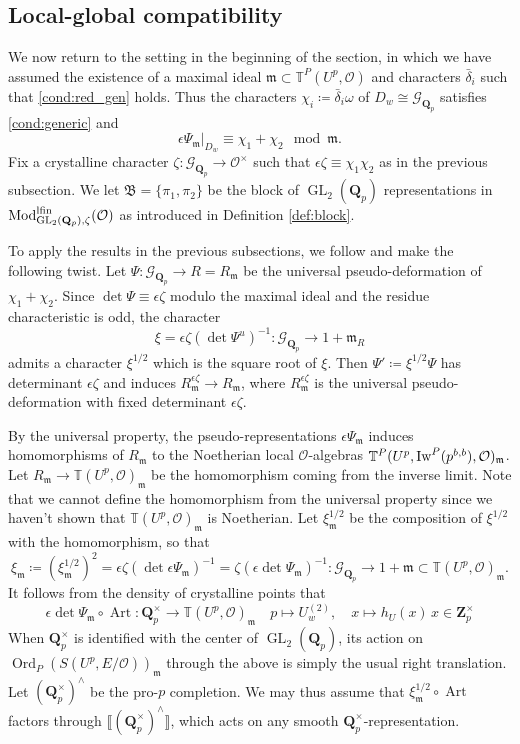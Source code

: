 \documentclass[leqno]{amsart}
\newcommand{\TT}{\mathbb{T}} %
\newcommand{\Iw}{\textnormal{Iw}}
\newcommand{\lfMod}{\textnormal{Mod}^{\textnormal{lfin}}}
\newcommand{\B}{\mathfrak B}
\newcommand{\Gp}{\mathcal{G}_{\Qp}} %
\DeclareMathOperator{\Ord}{Ord}
\DeclareMathOperator{\Art}{Art}
\DeclareMathOperator{\GL}{GL}
\newcommand{\Qp}{\mathbf{Q}_p}
\newcommand{\Zp}{\mathbf{Z}_p}
\newcommand{\oo}{\mathcal{O}} %
\newcommand{\fm}{\mathfrak{m}}
\theoremstyle{definition}
\theoremstyle{remark}
\begin{document}
\subsection{Local-global compatibility}
\label{sub:compatible}

We now return to the setting in 
the beginning of the section,
in which we have assumed 
the existence of
a maximal ideal $\fm\subset \TT^P(U^p,\oo)$ 
and characters $\bar{\delta}_i$
such that \eqref{cond:red_gen} holds.
Thus the characters
$\chi_i\coloneqq\bar{\delta}_i\omega$
of $D_w\cong \Gp$
satisfies \eqref{cond:generic} and
\[
	\epsilon\Psi_\fm\vert_{D_w}\equiv
	\chi_1+\chi_2 \mod \fm.
\]
Fix a crystalline character 
$\zeta\colon \Gp\to \oo^\times$ 
such that $\epsilon\zeta\equiv \chi_1\chi_2$
as in the previous subsection.
We let $\B=\{\pi_1,\pi_2\}$
be the block of $\GL_2(\Qp)$
representations
in $\lfMod_{\GL_2(\Qp),\zeta}(\oo)$
as introduced in Definition \ref{def:block}.


To apply the results in the previous subsections,
we follow \cite{urban} and make the following twist.
Let $\Psi\colon \Gp\to R=R_{\fm}$ be 
the universal pseudo-deformation of $\chi_1+\chi_2$.
Since $\det\Psi\equiv \epsilon\zeta$ modulo the 
maximal ideal and the residue characteristic is odd,
the character
\[
	\xi=\epsilon\zeta(\det \Psi^u)^{-1}\colon
	\Gp\to 1+\fm_R
\]
admits a character $\xi^{1/2}$ which is the square root of $\xi$.
Then  $\Psi'\coloneqq \xi^{1/2}\Psi$ has determinant $\epsilon\zeta$
and induces $R_\fm^{\epsilon\zeta}\to R_\fm$,
where $R_\fm^{\epsilon\zeta}$ is the universal 
pseudo-deformation with fixed determinant $\epsilon\zeta$.

By the universal property,
the pseudo-representations
$\epsilon\Psi_{\fm}$
induces homomorphisms of $R_\fm$ 
to the Noetherian local $\oo$-algebras
$\TT^P(U^p,\Iw^P(p^{b,b}),\oo)_{\fm}$.
Let $R_{\fm}\to \TT(U^p,\oo)_{\fm}$
be the homomorphism
coming from the inverse limit.
Note that we cannot define the homomorphism
from the universal property
since we haven't shown that
$\TT(U^p,\oo)_{\fm}$ is Noetherian.
Let $\xi_\fm^{1/2}$ be the  composition 
of $\xi^{1/2}$ with the homomorphism,
so that 
\[
	\xi_\fm\coloneqq(\xi_\fm^{1/2})^2=
	\epsilon\zeta(\det \epsilon\Psi_\fm)^{-1}
	=\zeta(\epsilon\det \Psi_\fm)^{-1}\colon
	\Gp\to 1+\fm\subset \TT(U^p,\oo)_\fm.
\]
It follows from the density of crystalline points
that 
\[
	\epsilon\det\Psi_\fm\circ \Art\colon
	\Qp^\times\to \TT(U^p,\oo)_{\fm}\quad
	p\mapsto U_w^{(2)},\quad
	x\mapsto h_U(x)\,x\in\Zp^\times
\]
When $\Qp^\times$
is identified with the center of  $\GL_2(\Qp)$,
its action on $\Ord_P(S(U^p,E/\oo))_{\fm}$
through the above
is simply the usual right translation.
Let $(\Qp^\times)^\wedge$ be the pro-$p$ completion. 
We may thus assume that 
$\xi_{\fm}^{1/2}\circ \Art$
factors through $\llbracket (\Qp^\times)^\wedge\rrbracket$,
which acts on any smooth $\Qp^\times$-representation.
\end{document}
